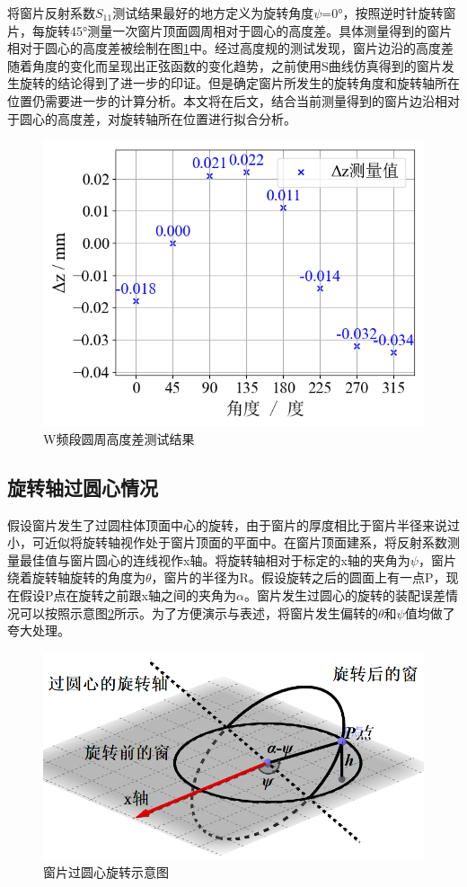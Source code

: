 \documentclass[master]{thesis-uestc}
\begin{document}
将窗片反射系数$S_{11}$测试结果最好的地方定义为旋转角度\(\psi\)=0°，按照逆时针旋转窗片，每旋转45°测量一次窗片顶面圆周相对于圆心的高度差。具体测量得到的窗片相对于圆心的高度差被绘制在图\ref{fig:W频段圆周高度差测试结果}中。经过高度规的测试发现，窗片边沿的高度差随着角度的变化而呈现出正弦函数的变化趋势，之前使用S曲线仿真得到的窗片发生旋转的结论得到了进一步的印证。但是确定窗片所发生的旋转角度和旋转轴所在位置仍需要进一步的计算分析。本文将在后文，结合当前测量得到的窗片边沿相对于圆心的高度差，对旋转轴所在位置进行拟合分析。
\begin{figure}[!htb]
    \centering
    \includegraphics[width=0.5\linewidth]{pic/chapter5/可视化高度差.png}
    \caption{W频段圆周高度差测试结果}
    \label{fig:W频段圆周高度差测试结果}
\end{figure}

\subsection{旋转轴过圆心情况}
假设窗片发生了过圆柱体顶面中心的旋转，由于窗片的厚度相比于窗片半径来说过小，可近似将旋转轴视作处于窗片顶面的平面中。在窗片顶面建系，将反射系数测量最佳值与窗片圆心的连线视作x轴。将旋转轴相对于标定的x轴的夹角为$\psi$，窗片绕着旋转轴旋转的角度为$\theta$，窗片的半径为R。假设旋转之后的圆面上有一点P，现在假设P点在旋转之前跟x轴之间的夹角为\(\alpha \)。窗片发生过圆心的旋转的装配误差情况可以按照示意图\ref{fig:过圆心旋转示意图}所示。为了方便演示与表述，将窗片发生偏转的\(\theta\)和\(\psi\)值均做了夸大处理。
\begin{figure}[!htb]
    \centering
    \includegraphics[width=0.5\linewidth]{pic/chapter5/过圆心旋转示意图.png}
    \caption{窗片过圆心旋转示意图}
    \label{fig:过圆心旋转示意图}
\end{figure}
\end{document}
